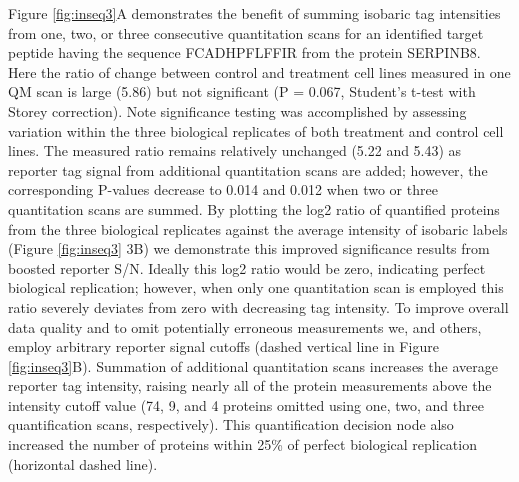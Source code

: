 Figure \ref{fig:inseq3}A demonstrates the benefit of summing isobaric tag intensities from one, two, or three consecutive quantitation scans for an \inseq{} identified target peptide having the sequence FCADHPFLFFIR from the protein SERPINB8. Here the ratio of change between control and treatment cell lines measured in one QM scan is large (5.86) but not significant (P = 0.067, Student's t-test with Storey correction).\cite{storey} Note significance testing was accomplished by assessing variation within the three biological replicates of both treatment and control cell lines. The measured ratio remains relatively unchanged (5.22 and 5.43) as reporter tag signal from additional quantitation scans are added; however, the corresponding P-values decrease to 0.014 and 0.012 when two or three quantitation scans are summed. By plotting the log2 ratio of quantified proteins from the three biological replicates against the average intensity of isobaric labels (Figure \ref{fig:inseq3} 3B) we demonstrate this improved significance results from boosted reporter S/N. Ideally this log2 ratio would be zero, indicating perfect biological replication; however, when only one quantitation scan is employed this ratio severely deviates from zero with decreasing tag intensity. To improve overall data quality and to omit potentially erroneous measurements we, and others, employ arbitrary reporter signal cutoffs (dashed vertical line in Figure \ref{fig:inseq3}B). Summation of additional quantitation scans increases the average reporter tag intensity, raising nearly all of the protein measurements above the intensity cutoff value (74, 9, and 4 proteins omitted using one, two, and three quantification scans, respectively). This quantification decision node also increased the number of proteins within 25\% of perfect biological replication (horizontal dashed line).

